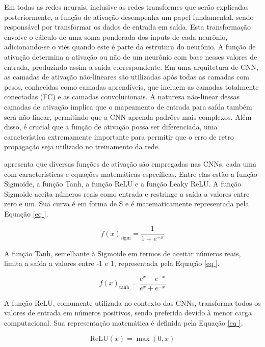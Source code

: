 Em todas as redes neurais, inclusive as redes transformes que serão explicadas posteriormente, a função de ativação desempenha um papel fundamental, sendo responsável por transformar os dados de entrada em saída. Esta transformação envolve o cálculo de uma soma ponderada dos inputs de cada neurônio, adicionando-se o viés quando este é parte da estrutura do neurônio. A função de ativação determina a ativação ou não de um neurônio com base nesses valores de entrada, produzindo assim a saída correspondente. Em uma arquitetura de CNN, as camadas de ativação não-lineares são utilizadas após todas as camadas com pesos, conhecidas como camadas aprendíveis, que incluem as camadas totalmente conectadas (FC) e as camadas convolucionais. A natureza não-linear dessas camadas de ativação implica que o mapeamento de entrada para saída também será não-linear, permitindo que a CNN aprenda padrões mais complexos. Além disso, é crucial que a função de ativação possa ser diferenciada, uma característica extremamente importante para permitir que o erro de retro propagação seja utilizado no treinamento da rede.

\textcite{Alzubaidi2021} apresenta que diversas funções de ativação são empregadas nas CNNs, cada uma com características e equações matemáticas específicas. Entre elas estão a função Sigmoide, a função Tanh, a função ReLU e a função Leaky ReLU. A função Sigmoide aceita números reais como entrada e restringe a saída a valores entre zero e um. Sua curva é em forma de S e é matematicamente representada pela Equação \ref{eq
}.

\begin{equation}
f(x)_{\text{sigm}} = \frac{1}{1 + e^{-x}}
\label{eq
}
\end{equation}

A função Tanh, semelhante à Sigmoide em termos de aceitar números reais, limita a saída a valores entre -1 e 1, representada pela Equação \ref{eq
}.

\begin{equation}
f(x)_{\text{tanh}} = \frac{e^x - e^{-x}}{e^x + e^{-x}}
\label{eq
}
\end{equation}

A função ReLU, comumente utilizada no contexto das CNNs, transforma todos os valores de entrada em números positivos, sendo preferida devido à menor carga computacional. Sua representação matemática é definida pela Equação \ref{eq
}.

\begin{equation}
\text{ReLU}(x) = \max(0, x)
\label{eq
}
\end{equation}


